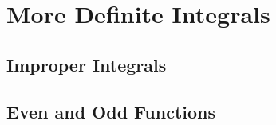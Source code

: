 \section{More Definite Integrals}

\subsection{Improper Integrals}

\subsection{Even and Odd Functions}
